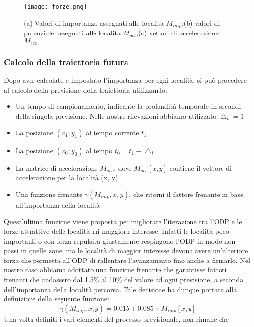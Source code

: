 \begin{figure}
\begin{center}
\texttt{[image: forze.png]}
\caption[Arda 2]{(a) Valori di importanza assegnati alle localita $M_{imp}$;(b) valori di potenziale assegnati alle localita $M_{pot}$;(c) vettori
di accelerazione $M_{acc}$}
\label{etichetta}
\end{center}
\end{figure}

\subsubsection{Calcolo della traiettoria futura}
Dopo aver calcolato e impostato l'importanza per ogni localit\`a, si pu\`o procedere
al calcolo della previsione della traiettoria utilizzando:
\begin{itemize}
\item Un tempo di campionamento, indicante la profondit\`a temporale in secondi
della singola previsione. Nelle nostre rilevazioni abbiamo utilizzato $\bigtriangleup_{t} = 1$
\item La posizione $(x_{1}; y_{1})$ al tempo corrente $t_{1}$
\item La posizione $(x_{0}; y_{0})$ al tempo $t_{0} = t_{1} - \bigtriangleup_{t}$
\item La matrice di accelerazione $M_{acc}$, dove $M_{acc}[x,y]$ contiene il vettore di
accelerazione per la localit\`a (x, y)
\item Una funzione frenante $\gamma(M_{imp},x,y)$, che ritorni il fattore frenante in base
all'importanza della localit\`a
\end{itemize}
Quest'ultima funzione viene proposta per migliorare l'iterazione tra l'ODP e le
forze attrattive delle localit\`a mi maggiorn interesse. Infatti le localit\`a
poco importanti o con forza repulsiva giustamente respingono l'ODP in modo non
passi in quelle zone, ma le localit\`a di maggior interesse devono avere un'ulteriore
forza che permetta all'ODP di rallentare l'avanzamento fino anche a firmarlo.
Nel nostro caso abbiamo adottato una funzione frenante che garantisse
fattori frenanti che andassero dal 1.5\% al 10\% del valore ad ogni previsione,
a seconda dell'importanza della localit\`a percorsa. Tale decisione ha dunque
portato alla definizione della seguente funzione:
\begin{equation}
    \gamma(M_{imp},x,y) = 0.015 + 0.085 \times M_{imp}[x,y]
\end{equation}
Una volta definiti i vari elementi del processo previsionale, non rimane che
